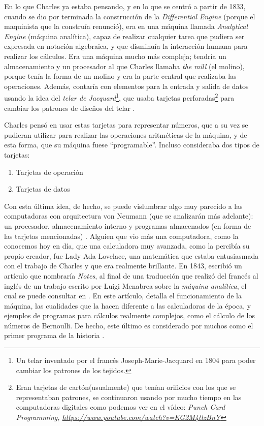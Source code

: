 \documentclass[letterpaper,12pt,oneside]{book}
\begin{document}
		En lo que Charles ya estaba pensando, y en lo que se centró a partir de 1833, cuando se dio por terminada la construcción de la \textit{Differential Engine} (porque el maquinista que la 
		construía renunció), era en una máquina llamada  \textit{Analytical Engine} (máquina analítica), capaz de realizar cualquier tarea que pudiera
		ser expresada en notación algebraica,  y que disminuía la interacción humana para realizar los cálculos.   Era una máquina mucho más compleja; tendría un
		almacenamiento y un procesador al que Charles llamaba \textit{the mill} (el molino), porque tenía la forma de un molino y era la parte central que realizaba las operaciones. Además,
		contaría con elementos para la entrada y salida de datos usando la idea del \textit{telar de Jacquard}\footnote{Un telar inventado por el francés Joseph-Marie-Jacquard en 1804 para poder cambiar los patrones de los tejidos.}, que usaba tarjetas perforadas\footnote{Eran tarjetas de 
		cartón(usualmente) que tenían orificios con los que se representaban patrones, se continuaron usando por mucho tiempo en las computadoras digitales como podemos ver en 
		el vídeo: \emph{Punch Card Programming, \url{https://www.youtube.com/watch?v=KG2M4ttzBnY} }}
		para cambiar los patrones de diseños del telar \cite{oregan_brief_2012}.
  
        Charles pensó en usar estas tarjetas para representar números, que a su vez se pudieran utilizar para realizar las operaciones
		aritméticas de la máquina, y de esta forma,  que su máquina fuese ``programable''. Incluso consideraba dos tipos de tarjetas:
		
		\begin{enumerate}
			\item Tarjetas de operación
			\item Tarjetas de datos
		\end{enumerate}
		
		Con esta última idea, de hecho, se puede vislumbrar algo muy parecido a las computadoras con arquitectura von Neumann (que se analizarán más adelante): un procesador, almacenamiento interno y 
		programas almacenados (en forma de las tarjetas mencionadas) \cite[p.204]{oregan_brief_2012}. 
        Alguien que vio más una computadora, como la conocemos hoy en día, que una calculadora muy avanzada, como la percibía
        su propio creador, fue  Lady Ada Lovelace, una matemática
		que estaba entusiasmada con el trabajo de Charles y que era realmente brillante. En 1843, escribió un artículo que 
		nombraría \textit{Notes}, al final de una traducción  que realizó del francés al inglés de un trabajo
		 escrito por Luigi Menabrea sobre la \textit{máquina analítica}, el cual se puede consultar en \cite{lovelace_scientific_1843}. En este artículo, detalla el funcionamiento de la máquina, las cualidades que la 
		hacen diferente a las calculadoras de la época, y
		ejemplos de programas para cálculos realmente complejos, como el cálculo de los números de Bernoulli. De hecho, este último es considerado 
		por muchos como
		el primer programa de la historia \cite{eric_kim_ada_1999}.
  
\end{document}
